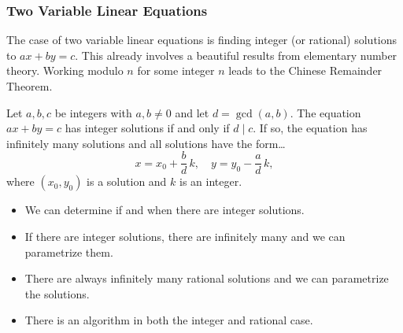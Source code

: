 \begin{frame}[plain] \frametitle{Two Variable Linear Equations} \scriptsize
The case of two variable linear equations is finding integer (or rational) solutions to $ax + by= c$. This already involves a beautiful results from elementary number theory. Working modulo $n$ for some integer $n$ leads to the Chinese Remainder Theorem. 

\begin{thm}
Let $a, b, c$ be integers with $a, b \neq 0$ and let $d= \gcd(a, b)$. The equation $ax + by= c$ has integer solutions if and only if $d \mid c$. If so, the equation has infinitely many solutions and all solutions have the form\dots
	\[
	x= x_0 + \frac{b}{d} \, k, \quad y= y_0 - \frac{a}{d} \, k,
	\]
where $(x_0, y_0)$ is a solution and $k$ is an integer. 
\end{thm}

\begin{itemize}
\item We can determine if and when there are integer solutions.
\item If there are integer solutions, there are infinitely many and we can parametrize them.
\item There are always infinitely many rational solutions and we can parametrize the solutions.
\item There is an algorithm in both the integer and rational case. 
\end{itemize}
\end{frame}



